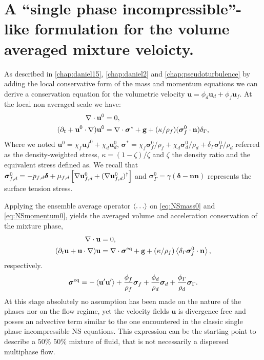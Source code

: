 \section{A ``single phase incompressible''-like formulation for the volume averaged mixture veloicty. }

As described in \ref{chap:daniel15}, \ref{chap:daniel2} and \ref{chap:pseudoturbulence} by adding the local conservative form of the mass and momentum equations we can derive a conservation equation for the volumetric velocity $\textbf{u} =\phi_d\textbf{u}_d + \phi_f \textbf{u}_f$. 
At the local non averaged scale we have: 
\begin{align}
    \label{eq:NSmass0}
    \div \textbf{u}^0 &= 0, \\
    (\pddt 
    + \textbf{u}^0 \cdot \grad) \textbf{u}^0
    &= 
    \div \bm\sigma^*
    +\textbf{g}
    +(\kappa/\rho_f)(\bm\sigma_f^0\cdot \textbf{n})\delta_\Gamma,
    \label{eq:NSmomentum0}
\end{align}
Where we noted $\textbf{u}^0 = \chi_f \textbf{u}f^0 + \chi_d \textbf{u}_d^0$, $\bm\sigma^* = \chi_f \bm\sigma_f^0/\rho_f  + \chi_d \bm\sigma_d^0/\rho_d + \delta_\Gamma \bm\sigma_\Gamma^0/\rho_d $ referred as the density-weighted stress, $\kappa = (1-\zeta)/\zeta$ and $\zeta$ the density ratio and the equivalent stress defined as.
We recall that $\bm\sigma_{f,d}^0 = -p_{f,d}\bm\delta + \mu_{f,d}\left[\mathbf{\nabla} \textbf{u}_{f,d}^0+ (\mathbf{\nabla} \textbf{u}_{f,d}^0)^\dagger\right]$ and $\bm\sigma_\Gamma^0 = \gamma (\bm\delta - \textbf{nn})$ represents the surface tension stress.

Applying the ensemble average operator $\left<\ldots\right>$ on \ref{eq:NSmass0} and \ref{eq:NSmomentum0}, yields the averaged volume and acceleration conservation of the mixture phase, 
\begin{align}
    \div\textbf{u} &=0,\\
    (\pddt \textbf{u}  
    + \textbf{u} \cdot \grad )
    \textbf{u}
    &= 
    \div \bm{\sigma}^\text{eq} + 
    \textbf{g} 
    + (\kappa/\rho_f) \avg{\delta_\Gamma \bm{\sigma}_f^0 \cdot \textbf{n}},
    \label{eq:NS_firststep}
\end{align}
respectively. 
\begin{equation}
    \bm\sigma^\text{eq} = 
    - \left< \textbf{u}'\textbf{u}'\right>
    + \frac{\phi_f}{\rho_f}\bm\sigma_f
    + \frac{\phi_d}{\rho_d}\bm\sigma_d
    + \frac{\phi_\Gamma}{\rho_d} \bm\sigma_\Gamma. 
\end{equation}
At this stage absolutely no assumption has been made on the nature of the phases nor on the flow regime, yet the velocity fields $\textbf{u}$ is divergence free and posses an advective term similar to the one encountered in the classic single phase incompressible NS equations.
This expression can be the starting point to describe a $50\%$ $50\%$ mixture of fluid, that is not necessarily a dispersed multiphase flow. 

